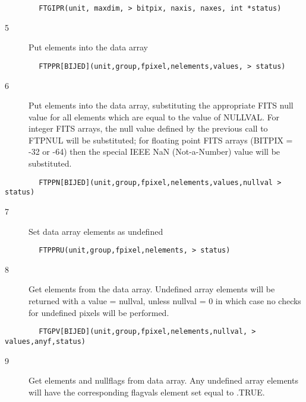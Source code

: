 \documentclass[11pt]{book}
\begin{document}
\begin{verbatim}
        FTGIPR(unit, maxdim, > bitpix, naxis, naxes, int *status)
\end{verbatim}

\begin{description}
\item[5 ]Put elements into the data array
\end{description}

\begin{verbatim}
        FTPPR[BIJED](unit,group,fpixel,nelements,values, > status)
\end{verbatim}

\begin{description}
\item[6 ]Put elements into the data array, substituting the appropriate FITS null
   value for all elements which are equal to the value of NULLVAL.  For
   integer FITS arrays, the null value defined by the previous call to FTPNUL
   will be substituted;  for floating point FITS arrays (BITPIX = -32
   or -64) then the special IEEE NaN (Not-a-Number) value will be
  substituted.
\end{description}

\begin{verbatim}
        FTPPN[BIJED](unit,group,fpixel,nelements,values,nullval > status)
\end{verbatim}

\begin{description}
\item[7 ]Set data array elements as undefined
\end{description}

\begin{verbatim}
        FTPPRU(unit,group,fpixel,nelements, > status)
\end{verbatim}

\begin{description}
\item[8 ] Get elements from the data array.  Undefined array elements will be
    returned with a value = nullval, unless nullval = 0 in which case no
   checks for undefined pixels will be performed.
\end{description}

\begin{verbatim}
        FTGPV[BIJED](unit,group,fpixel,nelements,nullval, > values,anyf,status)
\end{verbatim}

\begin{description}
\item[9 ] Get elements and nullflags from data array.
    Any undefined array elements will have the corresponding flagvals element
   set equal to .TRUE.
\end{description}
\end{document}
